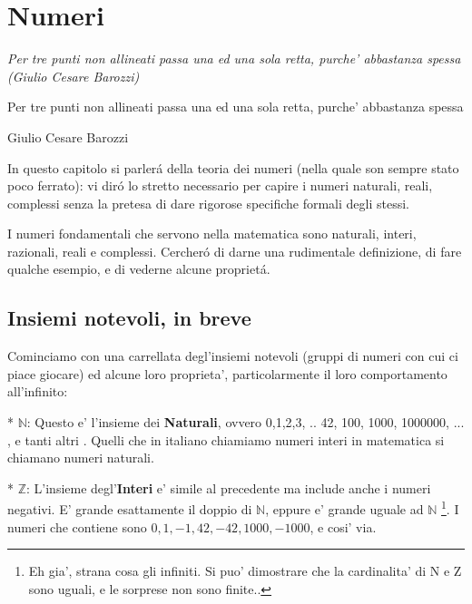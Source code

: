 \label{numeri}
\chapter{Numeri}

\em{Per tre punti non allineati passa una ed una sola retta, purche' abbastanza spessa (Giulio Cesare Barozzi)}

\epigraph{Per tre punti non allineati passa una ed una sola retta, purche' abbastanza spessa}{Giulio Cesare Barozzi}


In questo capitolo si parler\'a della teoria dei numeri (nella quale son sempre stato poco ferrato): vi dir\'o lo stretto necessario per capire i numeri naturali,
reali, complessi senza la pretesa di dare rigorose specifiche formali degli stessi.

I numeri fondamentali che servono nella matematica sono naturali, interi, razionali, reali e complessi. Cercher\'o di darne una rudimentale definizione,
di fare qualche esempio, e di vederne alcune propriet\'a.

\section{Insiemi notevoli, in breve}

Cominciamo con una carrellata degl'insiemi notevoli (gruppi di numeri con cui ci piace giocare) ed alcune loro proprieta', particolarmente il loro comportamento all'infinito:

* $\mathbb{N}$: Questo e' l'insieme dei \textbf{Naturali}, ovvero {0,1,2,3, .. 42, 100, 1000, 1000000, ... , e tanti altri }. Quelli che in
  italiano chiamiamo numeri interi in matematica si chiamano numeri naturali.

* $\mathbb{Z}$: L'insieme degl'\textbf{Interi} e' simile al precedente ma include anche i numeri negativi. 
 E' grande esattamente il doppio di $\mathbb{N}$, eppure e' grande uguale ad $\mathbb{N}$ \footnote{Eh gia', strana cosa gli infiniti. Si puo' dimostrare che la cardinalita' di N e Z sono uguali, e le sorprese non sono finite.. }.
 I numeri che contiene sono $0,1,-1,42,-42,1000,-1000$, e cosi' via.


